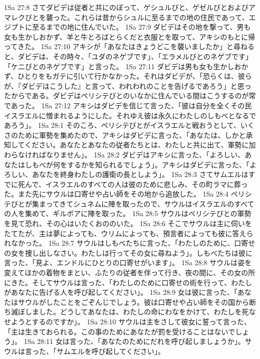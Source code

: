 1Sa 27:8  さてダビデは従者と共にのぼって、ゲシュルびと、ゲゼルびとおよびアマレクびとを襲った。これらは昔からシュルに至るまでの地の住民であって、エジプトに至るまでの地に住んでいた。
1Sa 27:9  ダビデはその地を撃って、男も女も生かしおかず、羊と牛とろばとらくだと衣服とを取って、アキシのもとに帰ってきた。
1Sa 27:10  アキシが「あなたはきょうどこを襲いましたか」と尋ねると、ダビデは、その時々、「ユダのネゲブです」、「エラメルびとのネゲブです」「ケニびとのネゲブです」と言った。
1Sa 27:11  ダビデは男も女も生かしおかず、ひとりをもガテに引いて行かなかった。それはダビデが、「恐らくは、彼らが、『ダビデはこうした』と言って、われわれのことを告げるであろう」と思ったからである。ダビデはペリシテびとのいなかに住んでいる間はこうするのが常であった。
1Sa 27:12  アキシはダビデを信じて言った、「彼は自分を全くその民イスラエルに憎まれるようにした。それゆえ彼は永久にわたしのしもべとなるであろう」。
1Sa 28:1  そのころ、ペリシテびとがイスラエルと戦おうとして、いくさのために軍勢を集めたので、アキシはダビデに言った、「あなたは、しかと承知してください。あなたとあなたの従者たちとは、わたしと共に出て、軍勢に加わらなければなりません」。
1Sa 28:2  ダビデはアキシに言った、「よろしい、あなたはしもべが何をするかを知られるでしょう」。アキシはダビデに言った、「よろしい、あなたを終身わたしの護衛の長としよう」。
1Sa 28:3  さてサムエルはすでに死んで、イスラエルのすべての人は彼のために悲しみ、その町ラマに葬った。また先にサウルは口寄せや占い師をその地から追放した。
1Sa 28:4  ペリシテびとが集まってきてシュネムに陣を取ったので、サウルはイスラエルのすべての人を集めて、ギルボアに陣を取った。
1Sa 28:5  サウルはペリシテびとの軍勢を見て恐れ、その心はいたくおののいた。
1Sa 28:6  そこでサウルは主に伺いをたてたが、主は夢によっても、ウリムによっても、預言者によっても彼に答えられなかった。
1Sa 28:7  サウルはしもべたちに言った、「わたしのために、口寄せの女を捜し出しなさい。わたしは行ってその女に尋ねよう」。しもべたちは彼に言った、「見よ、エンドルにひとりの口寄せがいます」。
1Sa 28:8  サウルは姿を変えてほかの着物をまとい、ふたりの従者を伴って行き、夜の間に、その女の所にきた。そしてサウルは言った、「わたしのために口寄せの術を行って、わたしがあなたに告げる人を呼び起してください」。
1Sa 28:9  女は彼に言った、「あなたはサウルがしたことをごぞんじでしょう。彼は口寄せや占い師をその国から断ち滅ぼしました。どうしてあなたは、わたしの命にわなをかけて、わたしを死なせようとするのですか」。
1Sa 28:10  サウルは主をさして彼女に誓って言った、「主は生きておられる。この事のためにあなたが罰を受けることはないでしょう」。
1Sa 28:11  女は言った、「あなたのためにだれを呼び起しましょうか」。サウルは言った、「サムエルを呼び起してください」。
